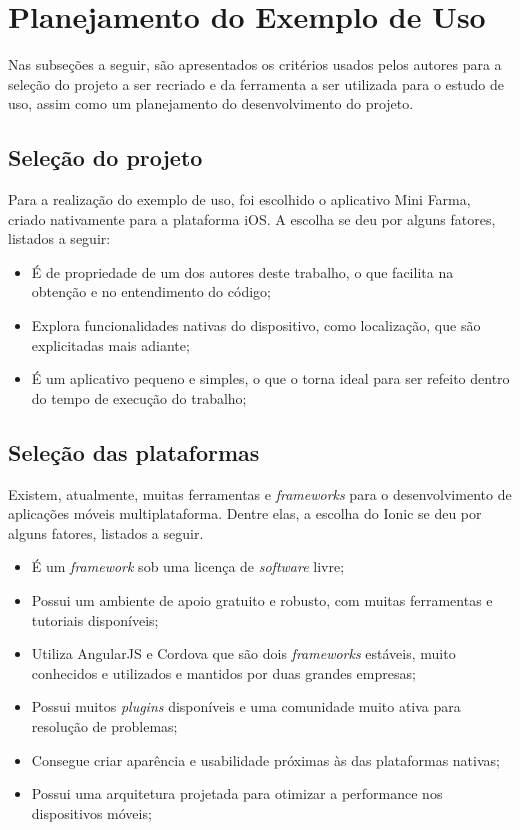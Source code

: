 \section{Planejamento do Exemplo de Uso} \label{section:planejamentoestudodecaso}

Nas subseções a seguir, são apresentados os critérios usados pelos autores para a seleção do projeto a ser recriado e da ferramenta a ser utilizada para o estudo de uso, assim como um planejamento
do desenvolvimento do projeto.

\subsection{Seleção do projeto} \label{subsection:selecaodoprojeto}

Para a realização do exemplo de uso, foi escolhido o aplicativo Mini Farma, criado nativamente para a plataforma iOS. A escolha se deu por alguns fatores, listados a seguir:

\begin{itemize}
    \item É de propriedade de um dos autores deste trabalho, o que facilita na obtenção e no entendimento do código;
    \item Explora funcionalidades nativas do dispositivo, como localização, que são explicitadas mais adiante;
    \item É um aplicativo pequeno e simples, o que o torna ideal para ser refeito dentro do tempo de execução do trabalho;
\end{itemize}

\subsection{Seleção das plataformas} \label{subsection:selecaodasplataformas}

Existem, atualmente, muitas ferramentas e \textit{frameworks} para o desenvolvimento de aplicações móveis multiplataforma. Dentre elas, a escolha do Ionic se deu por alguns fatores, listados a seguir. 

\begin{itemize}
    \item É um \textit{framework} sob uma licença de \textit{software} livre;
    \item Possui um ambiente de apoio gratuito e robusto, com muitas ferramentas e tutoriais disponíveis;
    \item Utiliza AngularJS e Cordova que são dois \textit{frameworks} estáveis, muito conhecidos e utilizados e mantidos por duas grandes empresas;
    \item Possui muitos \textit{plugins} disponíveis e uma comunidade muito ativa para resolução de problemas; %
    \item Consegue criar aparência e usabilidade próximas às das plataformas nativas; %
    \item Possui uma arquitetura projetada para otimizar a performance nos dispositivos móveis; 
\end{itemize}
 

